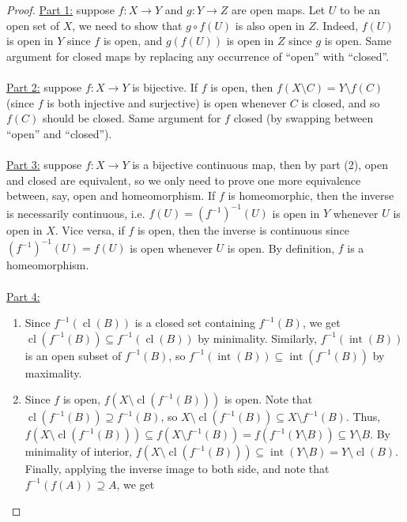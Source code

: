 \documentclass{treatise}
\begin{document}
\begin{proof}
\underline{Part 1:} suppose $f: X \to Y$ and $g: Y \to Z$ are open maps. Let $U$ to be an open set of $X$, we need to show that $g \circ f (U)$ is also open in $Z$. Indeed, $f(U)$ is open in $Y$ since $f$ is open, and $g(f(U))$ is open in $Z$ since $g$ is open. Same argument for closed maps by replacing any occurrence of ``open''  with ``closed''.
\\
\\
\underline{Part 2:} suppose $f: X \to Y$ is bijective. If $f$ is open, then $f(X \setminus C) = Y \setminus f(C)$ (since $f$ is both injective and surjective) is open whenever $C$ is closed, and so $f(C)$ should be closed. Same argument for $f$ closed (by swapping between ``open'' and ``closed'').
\\
\\
\underline{Part 3:} suppose $f: X \to Y$ is a bijective continuous map, then by part (2), open and closed are equivalent, so we only need to prove one more equivalence between, say, open and homeomorphism. If $f$ is homeomorphic, then the inverse is necessarily continuous, i.e. $f(U) = (f^{-1})^{-1}(U)$ is open in $Y$ whenever $U$ is open in $X$. Vice versa, if $f$ is open, then the inverse is continuous since $(f^{-1})^{-1}(U) = f(U)$ is open whenever $U$ is open. By definition, $f$ is a homeomorphism.
\\
\\
\underline{Part 4:}
\begin{enumerate}[label=(\alph*)]
    \item Since $f^{-1}(\operatorname{cl}(B))$ is a closed set containing $f^{-1}(B)$, we get $\operatorname{cl}(f^{-1}(B)) \subseteq f^{-1}(\operatorname{cl}(B))$ by minimality. Similarly, $f^{-1}(\operatorname{int}(B))$ is an open subset of $f^{-1}(B)$, so $f^{-1}(\operatorname{int}(B)) \subseteq \operatorname{int}(f^{-1}(B))$ by maximality.
    \item Since $f$ is open, $f(X \setminus \operatorname{cl}(f^{-1}(B)))$ is open. Note that $\operatorname{cl}(f^{-1}(B)) \supseteq f^{-1}(B)$, so $X \setminus \operatorname{cl}(f^{-1}(B)) \subseteq X \setminus f^{-1}(B)$. Thus, $f(X \setminus \operatorname{cl}(f^{-1}(B))) \subseteq f(X \setminus f^{-1}(B)) = f(f^{-1}(Y \setminus B)) \subseteq Y \setminus B$. By minimality of interior, $f(X \setminus \operatorname{cl}(f^{-1}(B))) \subseteq \operatorname{int}(Y \setminus B) = Y \setminus \operatorname{cl}(B)$. Finally, applying the inverse image to both side, and note that $f^{-1}(f(A)) \supseteq A$, we get

\end{enumerate}
\end{proof}
\end{document}
